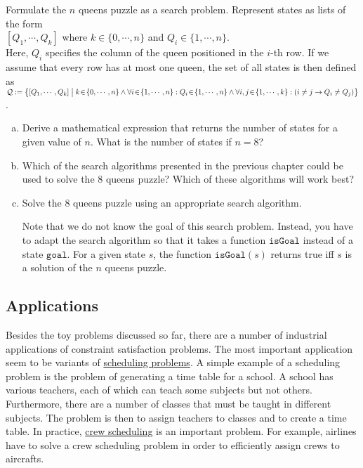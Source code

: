 \exercise
Formulate the $n$ queens puzzle as a search problem.  Represent states as lists of the form
\\[0.2cm]
\hspace*{1.3cm}
$[Q_1,\cdots,Q_k]$ \quad where $k \in \{0,\cdots,n\}$ and $Q_i \in \{1,\cdots,n\}$.
\\[0.2cm]
Here, $Q_i$ specifies the column of the queen positioned in the $i$-th row.  If we assume that every row has at
most one queen, the set of all states is then defined as
\\[0.2cm]
$\mathcal{Q}:=\bigl\{ [Q_1,\cdots,Q_k] \bigm| 
         k \el \{0,\cdots,n\} \wedge \forall i \el \{1,\cdots,n\}:Q_i \el \{1,\cdots,n\} \wedge 
         \forall i,j\el\{1,\cdots,k\}:(i \not=j \rightarrow Q_i \not= Q_j)
\bigr\}$.
\begin{enumerate}[(a)]
\item Derive a mathematical expression that returns the number of states for a given value of $n$.  
      What is the number of states if $n=8$?
\item Which of the search algorithms presented in the previous chapter could be used to solve the 8
      queens puzzle?  Which of these algorithms will work best?
\item Solve the 8 queens puzzle using an appropriate search algorithm.

      Note that we do not know the goal of this search problem.  Instead, you have to adapt the
      search algorithm so that it takes a function $\texttt{isGoal}$ instead of a state $\texttt{goal}$.  For a given
      state $s$, the function $\texttt{isGoal}(s)$ returns true iff $s$ is a solution of the $n$ queens puzzle.
      \eoxs
\end{enumerate}


\subsection{Applications}
Besides the toy problems discussed so far, there are a number of industrial applications of constraint
satisfaction problems.  The most important application seem to be variants of
\href{https://en.wikipedia.org/wiki/Scheduling_(production_processes)}{scheduling problems}. 
A simple example of a scheduling problem is the problem of generating a time table for a school.  A school has
various teachers, each of which can teach some subjects but not others.  Furthermore, there are a number of
classes that must be taught in different subjects.  The problem is then to assign teachers to classes and to
create a time table.  In practice, \href{https://en.wikipedia.org/wiki/Crew_scheduling}{crew scheduling} is an
important problem.  For example, airlines have to solve a crew scheduling problem in order to efficiently
assign crews to aircrafts.

